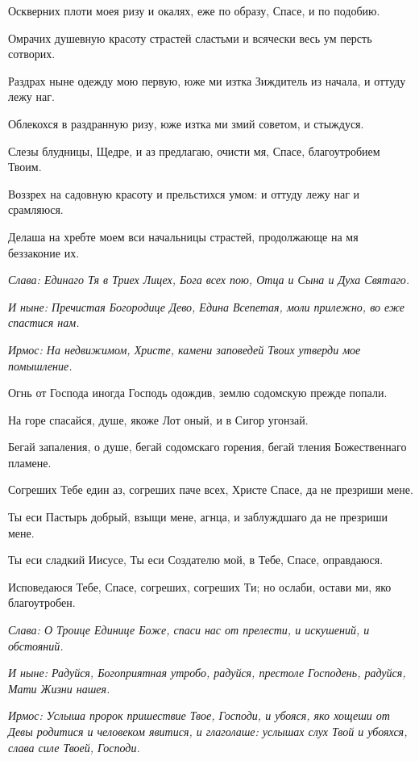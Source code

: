 Оскверних плоти моея ризу и окалях, еже по образу, Спасе, и по подобию. 

Омрачих душевную красоту страстей сластьми и всячески весь ум персть сотворих. 

Раздрах ныне одежду мою первую, юже ми изтка Зиждитель из начала, и оттуду лежу наг. 

Облекохся в раздранную ризу, юже изтка ми змий советом, и стыждуся. 

Слезы блудницы, Щедре, и аз предлагаю, очисти мя, Спасе, благоутробием Твоим. 

Воззрех на садовную красоту и прельстихся умом: и оттуду лежу наг и срамляюся. 

Делаша на хребте моем вси начальницы страстей, продолжающе на мя беззаконие их. 

\itshape Слава\normalfont{}: Единаго Тя в Триех Лицех, Бога всех пою, Отца и Сына и Духа Святаго. 

\itshape И ныне\normalfont{}: Пречистая Богородице Дево, Едина Всепетая, моли прилежно, во еже спастися нам. 


\itshape Ирмос\normalfont{}: На недвижимом, Христе, камени заповедей Твоих утверди мое помышление. 

Огнь от Господа иногда Господь одождив, землю содомскую прежде попали. 

На горе спасайся, душе, якоже Лот оный, и в Сигор угонзай. 

Бегай запаления, о душе, бегай содомскаго горения, бегай тления Божественнаго пламене. 

Согреших Тебе един аз, согреших паче всех, Христе Спасе, да не презриши мене. 

Ты еси Пастырь добрый, взыщи мене, агнца, и заблуждшаго да не презриши мене. 

Ты еси сладкий Иисусе, Ты еси Создателю мой, в Тебе, Спасе, оправдаюся. 

Исповедаюся Тебе, Спасе, согреших, согреших Ти; но ослаби, остави ми, яко благоутробен. 

\itshape Слава\normalfont{}: О Троице Единице Боже, спаси нас от прелести, и искушений, и обстояний. 

\itshape И ныне\normalfont{}: Радуйся, Богоприятная утробо, радуйся, престоле Господень, радуйся, Мати Жизни нашея. 


\itshape Ирмос\normalfont{}: Услыша пророк пришествие Твое, Господи, и убояся, яко хощеши от Девы родитися и человеком явитися, и глаголаше: услышах слух Твой и убояхся, слава силе Твоей, Господи. 

